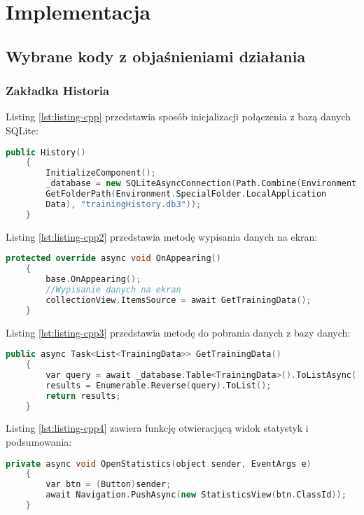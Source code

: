 	\newpage
\section{Implementacja}		%

\subsection{Wybrane kody z objaśnieniami działania}		%

\subsubsection{Zakładka Historia} %

\hspace{0.60cm}Listing \ref{lst:listing-cpp} przedstawia sposób inicjalizacji połączenia z bazą danych SQLite:
\begin{lstlisting}[caption=Połączenie z bazą danych, label={lst:listing-cpp}, language=C++]
	public History()
	{
		InitializeComponent();		
		_database = new SQLiteAsyncConnection(Path.Combine(Environment.
		GetFolderPath(Environment.SpecialFolder.LocalApplication
		Data), "trainingHistory.db3"));
	}
\end{lstlisting}

Listing \ref{lst:listing-cpp2} przedstawia metodę wypisania danych na ekran:
\begin{lstlisting}[caption=Wypisanie danych na ekran, label={lst:listing-cpp2}, language=C++]
	protected override async void OnAppearing()
	{
		base.OnAppearing();		
		//Wypisanie danych na ekran
		collectionView.ItemsSource = await GetTrainingData();
	}
\end{lstlisting}

Listing \ref{lst:listing-cpp3} przedstawia metodę do pobrania danych z bazy danych:
\begin{lstlisting}[caption=Pobranie danych z bazy, label={lst:listing-cpp3}, language=C++]
	public async Task<List<TrainingData>> GetTrainingData()
	{
		var query = await _database.Table<TrainingData>().ToListAsync();
		results = Enumerable.Reverse(query).ToList();
		return results;
	}
\end{lstlisting}

Listing \ref{lst:listing-cpp4} zawiera funkcję otwieracjącą widok statystyk i podsumowania:
\begin{lstlisting}[caption=Otwieranie widoku statystyk i podsumowania, label={lst:listing-cpp4}, language=C++]
	private async void OpenStatistics(object sender, EventArgs e)
	{
		var btn = (Button)sender;
		await Navigation.PushAsync(new StatisticsView(btn.ClassId));
	}
\end{lstlisting}

